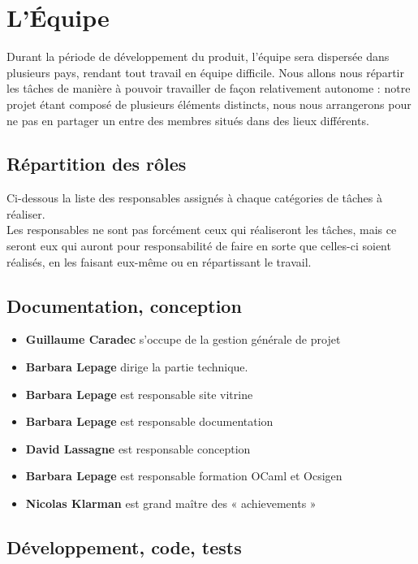 \documentclass{life-fr}
\begin{document}
\newpage

\section{L'Équipe}

Durant la période de développement du produit, l'équipe sera dispersée dans plusieurs pays, rendant tout travail en équipe difficile. Nous allons nous répartir les tâches de manière à pouvoir travailler de façon relativement autonome : notre projet étant composé de plusieurs éléments distincts, nous nous arrangerons pour ne pas en partager un entre des membres situés dans des lieux différents.\\

\subsection{ Répartition des rôles}

Ci-dessous la liste des responsables assignés à chaque catégories de tâches à
réaliser.\\
Les responsables ne sont pas forcément ceux qui réaliseront les tâches, mais ce
seront eux qui auront pour responsabilité de faire en sorte que celles-ci soient
réalisés, en les faisant eux-même ou en répartissant le travail.

\subsection{ Documentation, conception}

\begin{itemize}
  \item \textbf{Guillaume Caradec} s'occupe de la gestion générale de projet
  \item \textbf{Barbara Lepage} dirige la partie technique.
  \item \textbf{Barbara Lepage} est responsable site vitrine
  \item \textbf{Barbara Lepage} est responsable documentation
  \item \textbf{David Lassagne} est responsable conception
  \item \textbf{Barbara Lepage} est responsable formation OCaml et Ocsigen
  \item \textbf{Nicolas Klarman} est grand maître des « achievements »
\end{itemize}

\subsection{ Développement, code, tests}
\end{document}

